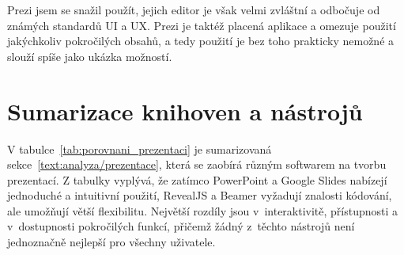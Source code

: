 Prezi jsem se snažil použít, jejich editor je však velmi zvláštní a odbočuje od známých standardů UI a UX.
Prezi je taktéž placená aplikace a omezuje použití jakýchkoliv pokročilých obsahů, a tedy použití je bez toho prakticky nemožné a slouží spíše jako ukázka možností.

\section{Sumarizace knihoven a nástrojů}

V tabulce~\ref{tab:porovnani_prezentaci} je sumarizovaná sekce~\ref{text:analyza/prezentace}, která se zaobírá různým softwarem na tvorbu prezentací.
Z tabulky vyplývá, že zatímco PowerPoint a Google Slides nabízejí jednoduché a intuitivní použití, RevealJS a Beamer vyžadují znalosti kódování, ale umožňují větší flexibilitu.
Největší rozdíly jsou v~interaktivitě, přístupnosti a v~dostupnosti pokročilých funkcí, přičemž žádný z~těchto nástrojů není jednoznačně nejlepší pro všechny uživatele.


\begin{table}[ht!]
    \centering
    \caption{Porovnání aplikací pro tvorbu prezentací}
    \label{tab:porovnani_prezentaci}
\end{table}


